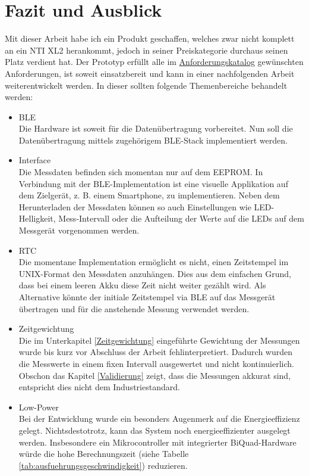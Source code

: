 \documentclass[12pt]{article}
\begin{document}
	\newpage
	\section{Fazit und Ausblick} \label{Fazit}
	Mit dieser Arbeit habe ich ein Produkt geschaffen, welches zwar nicht komplett an ein NTI XL2 herankommt, jedoch in seiner Preiskategorie durchaus seinen Platz verdient hat. Der Prototyp erfüllt alle im \hyperref[Anhang:Anforderungskatalog]{Anforderungskatalog} gewünschten Anforderungen, ist soweit einsatzbereit und kann in einer nachfolgenden Arbeit weiterentwickelt werden. In dieser sollten folgende Themenbereiche behandelt werden:
	\begin{itemize}
		\item BLE \\
		Die Hardware ist soweit für die Datenübertragung vorbereitet. Nun soll die Datenübertragung mittels zugehörigem BLE-Stack implementiert werden.
		\item Interface \\
		Die Messdaten befinden sich momentan nur auf dem EEPROM. In Verbindung mit der BLE-Implementation ist eine visuelle Applikation auf dem Zielgerät, z. B. einem Smartphone, zu implementieren. Neben dem Herunterladen der Messdaten können so auch Einstellungen wie LED-Helligkeit, Mess-Intervall oder die Aufteilung der Werte auf die LEDs auf dem Messgerät vorgenommen werden.
		\item RTC \\
		Die momentane Implementation ermöglicht es nicht, einen Zeitstempel im UNIX-Format den Messdaten anzuhängen. Dies aus dem einfachen Grund, dass bei einem leeren Akku diese Zeit nicht weiter gezählt wird. Als Alternative könnte der initiale Zeitstempel via BLE auf das Messgerät übertragen und für die anstehende Messung verwendet werden.
		\item Zeitgewichtung \\
		Die im Unterkapitel \ref{Zeitgewichtung} eingeführte Gewichtung der Messungen wurde bis kurz vor Abschluss der Arbeit fehlinterpretiert. Dadurch wurden die Messwerte in einem fixen Intervall ausgewertet und nicht kontinuierlich. Obschon das Kapitel \ref{Validierung} zeigt, dass die Messungen akkurat sind, entspricht dies nicht dem Industriestandard.
		\item Low-Power \\
		Bei der Entwicklung wurde ein besonders Augenmerk auf die Energieeffizienz gelegt. Nichtsdestotrotz, kann das System noch energieeffizienter ausgelegt werden. Insbesondere ein Mikrocontroller mit integrierter BiQuad-Hardware würde die hohe Berechnungszeit (siehe Tabelle \ref{tab:ausfuehrungsgeschwindigkeit}) reduzieren.

\end{itemize}
\end{document}
